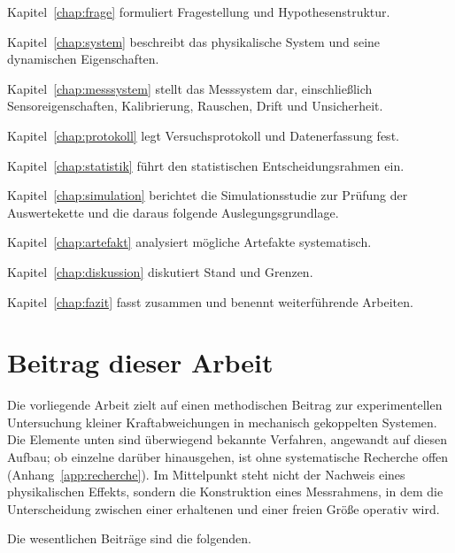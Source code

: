 \documentclass[12pt,a4paper]{report}
\begin{document}
Kapitel~\ref{chap:frage} formuliert Fragestellung und Hypothesenstruktur.

Kapitel~\ref{chap:system} beschreibt das physikalische System und seine dynamischen
Eigenschaften.

Kapitel~\ref{chap:messsystem} stellt das Messsystem dar, einschließlich
Sensoreigenschaften, Kalibrierung, Rauschen, Drift und Unsicherheit.

Kapitel~\ref{chap:protokoll} legt Versuchsprotokoll und Datenerfassung fest.

Kapitel~\ref{chap:statistik} führt den statistischen Entscheidungsrahmen ein.

Kapitel~\ref{chap:simulation} berichtet die Simulationsstudie zur Prüfung der Auswertekette
und die daraus folgende Auslegungsgrundlage.

Kapitel~\ref{chap:artefakt} analysiert mögliche Artefakte systematisch.

Kapitel~\ref{chap:diskussion} diskutiert Stand und Grenzen.

Kapitel~\ref{chap:fazit} fasst zusammen und benennt weiterführende Arbeiten.

\section{Beitrag dieser Arbeit}
\label{sec:beitrag}

Die vorliegende Arbeit zielt auf einen methodischen Beitrag zur
experimentellen Untersuchung kleiner Kraftabweichungen in mechanisch
gekoppelten Systemen. Die Elemente unten sind überwiegend bekannte
Verfahren, angewandt auf diesen Aufbau; ob einzelne darüber hinausgehen,
ist ohne systematische Recherche offen (Anhang~\ref{app:recherche}). Im Mittelpunkt steht nicht der Nachweis eines
physikalischen Effekts, sondern die Konstruktion eines Messrahmens, in
dem die Unterscheidung zwischen einer erhaltenen und einer freien Größe
operativ wird.

Die wesentlichen Beiträge sind die folgenden.
\end{document}
